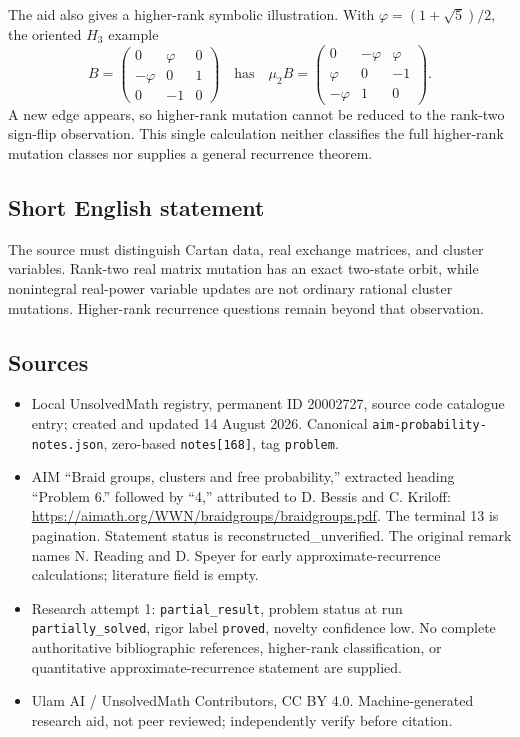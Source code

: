 \documentclass[11pt]{article}
\begin{document}
The aid also gives a higher-rank symbolic illustration. With $\varphi=(1+\sqrt5)/2$, the oriented $H_3$ example
\[
 B=\begin{pmatrix}0&\varphi&0\\-\varphi&0&1\\0&-1&0\end{pmatrix}
 \quad\text{has}\quad
 \mu_2B=\begin{pmatrix}0&-\varphi&\varphi\\\varphi&0&-1\\-\varphi&1&0\end{pmatrix}.
\]
A new edge appears, so higher-rank mutation cannot be reduced to the rank-two sign-flip observation. This single calculation neither classifies the full higher-rank mutation classes nor supplies a general recurrence theorem.
\subsection{Short English statement}
The source must distinguish Cartan data, real exchange matrices, and cluster variables. Rank-two real matrix mutation has an exact two-state orbit, while nonintegral real-power variable updates are not ordinary rational cluster mutations. Higher-rank recurrence questions remain beyond that observation.
\subsection{Sources}
\begin{itemize}
\item Local UnsolvedMath registry, permanent ID 20002727, source code catalogue entry; created and updated 14 August 2026. Canonical \texttt{aim-probability-notes.json}, zero-based \texttt{notes[168]}, tag \texttt{problem}.
\item AIM ``Braid groups, clusters and free probability,'' extracted heading ``Problem 6.'' followed by ``4,'' attributed to D. Bessis and C. Kriloff: \url{https://aimath.org/WWN/braidgroups/braidgroups.pdf}. The terminal 13 is pagination. Statement status is reconstructed\_unverified. The original remark names N. Reading and D. Speyer for early approximate-recurrence calculations; literature field is empty.
\item Research attempt 1: \texttt{partial\_result}, problem status at run \texttt{partially\_solved}, rigor label \texttt{proved}, novelty confidence low. No complete authoritative bibliographic references, higher-rank classification, or quantitative approximate-recurrence statement are supplied.
\item Ulam AI / UnsolvedMath Contributors, CC BY 4.0. Machine-generated research aid, not peer reviewed; independently verify before citation.
\end{itemize}
\end{document}
